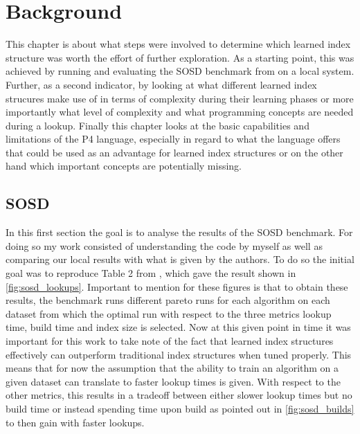 
\chapter{Background}
\label{ch:background}
This chapter is about what steps were involved to determine which learned index structure was worth the effort of further exploration. As a starting point, this was achieved by running and evaluating the SOSD benchmark from \cite{sosd-neurips} on a local system. Further, as a second indicator, by looking at what different learned index strucures make use of in terms of complexity during their learning phases or more importantly what level of complexity and what programming concepts are needed during a lookup.\newline
Finally this chapter looks at the basic capabilities and limitations of the P4 language, especially in regard to what the language offers that could be used as an advantage for learned index structures or on the other hand which important concepts are potentially missing.

\section{SOSD}
In this first section the goal is to analyse the results of the SOSD benchmark. For doing so my work consisted of understanding the code by myself as well as comparing our local results with what is given by the authors. To do so the initial goal was to reproduce Table 2 from \cite{sosd-neurips}, which gave the result shown in \ref{fig:sosd_lookups}. Important to mention for these figures is that to obtain these results, the benchmark runs different pareto runs for each algorithm on each dataset from which the optimal run with respect to the three metrics lookup time, build time and index size is selected. Now at this given point in time it was important for this work to take note of the fact that learned index structures effectively can outperform traditional index structures when tuned properly. This means that for now the assumption that the ability to train an algorithm on a given dataset can translate to faster lookup times is given. With respect to the other metrics, this results in a tradeoff between either slower lookup times but no build time or instead spending time upon build as pointed out in \ref{fig:sosd_builds} to then gain with faster lookups.



